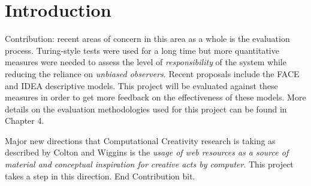 \chapter{Introduction}
\ifpdf
    \graphicspath{{Introduction/IntroductionFigs/PNG/}{Introduction/IntroductionFigs/PDF/}{Introduction/IntroductionFigs/}}
\else
    \graphicspath{{Introduction/IntroductionFigs/EPS/}{Introduction/IntroductionFigs/}}
\fi


Contribution:
recent areas of concern in this area as a whole is the evaluation process. Turing-style tests were used for a long time but more quantitative measures were needed to assess the level of \textit{responsibility} of the system while reducing the reliance on \textit{unbiased observers}. Recent proposals include the FACE and IDEA descriptive models. This project will be evaluated against these measures in order to get more feedback on the effectiveness of these models. More details on the evaluation methodologies used for this project can be found in Chapter 4.

Major new directions that Computational Creativity research is taking as described by Colton and Wiggins is the
\textit{usage of web resources as a source of material and conceptual inspiration for creative acts by computer}. This project takes a step in this direction.
End Contribution bit.

